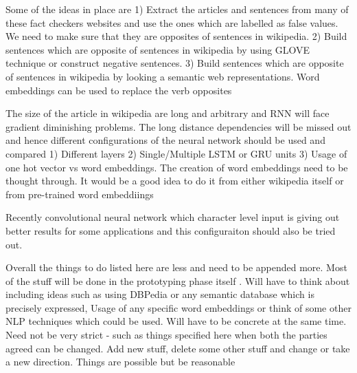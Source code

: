 \documentclass[a4paper, 11pt]{article}
\begin{document}
Some of the ideas in place are
1) Extract the articles and sentences from many of these fact checkers websites and use the ones which are labelled as false values. We need to make sure that they are opposites of sentences in wikipedia.
2) Build sentences which are opposite of sentences in wikipedia by using GLOVE technique or construct negative sentences. 
3) Build sentences which are opposite of sentences in wikipedia by looking a semantic web representations. Word embeddings can be used to replace the verb opposites 

The size of the article in wikipedia are long and arbitrary and RNN will face gradient diminishing problems. The long distance dependencies will be missed out and hence different configurations of the neural network should be used and compared 
1) Different layers
2) Single/Multiple LSTM or GRU units
3) Usage of one hot vector vs word embeddings. The creation of word embeddings need to be thought through. It would be a good idea to do it from either wikipedia itself or from pre-trained word embeddiings


Recently convolutional neural network which character level input is giving out better results for some applications and this configuraiton should also be tried out.






\color{red}
Overall the things to do listed here are less and need to be appended more. Most of the stuff will be done in the prototyping phase itself . Will have to think about including ideas such as using DBPedia or any semantic database which is precisely expressed, Usage of any specific word embeddings or think of some other NLP techniques which could be used. Will have to be concrete at the same time. Need not be very strict - such as things specified here when both the parties agreed can be changed. Add new stuff, delete some other stuff and change or take a new direction. Things are possible but be reasonable
\end{document}
